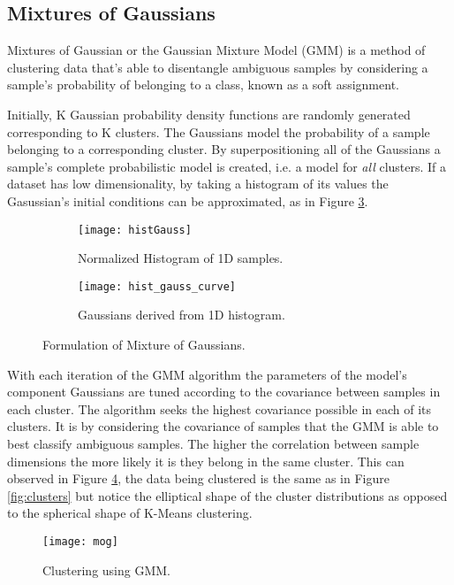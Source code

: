  \subsection{Mixtures of Gaussians}

Mixtures of Gaussian or the Gaussian Mixture Model (GMM) is a method of clustering data that's able to disentangle ambiguous samples by considering a sample's probability of belonging to a class, known as a soft assignment. 

Initially, K Gaussian probability density functions are randomly generated corresponding to K clusters. The Gaussians model the probability of a sample belonging to a corresponding cluster. By superpositioning all of the Gaussians a sample's complete probabilistic model is created, i.e. a model for \emph{all} clusters. If a dataset has low dimensionality, by taking a histogram of its values the Gasussian's initial conditions can be approximated, as in Figure \ref{fig:mixture}.

\begin{figure}[H]
	\centering
	\begin{subfigure}[b]{0.5\linewidth}
            \centering\texttt{[image: histGauss]}
      		\caption{Normalized Histogram of 1D samples.}
		\label{fig:histGauss}
    	\end{subfigure}%
    	\begin{subfigure}[b]{0.5\linewidth}
      		\centering\texttt{[image: hist\_gauss\_curve]}
      		\caption{Gaussians derived from 1D histogram. }
       		\label{fig:histCurve}
		\end{subfigure}
		\caption{Formulation of Mixture of Gaussians.}
    	\label{fig:mixture}
\end{figure}

With each iteration of the GMM algorithm the parameters of the model's component Gaussians are tuned according to the covariance between samples in each cluster. The algorithm seeks the highest covariance possible in each of its clusters. It is by considering the covariance of samples that the GMM is able to best classify ambiguous samples. The higher the correlation between sample dimensions the more likely it is they belong in the same cluster. This can observed in Figure \ref{fig:mogcov}, the data being clustered is the same as in Figure \ref{fig:clusters} but notice the elliptical shape of the cluster distributions as opposed to the spherical shape of K-Means clustering.

\begin{figure}[H]
	\centering
	\centering\texttt{[image: mog]}
	\caption{Clustering using GMM.}
	\label{fig:mogcov}
\end{figure}
  

